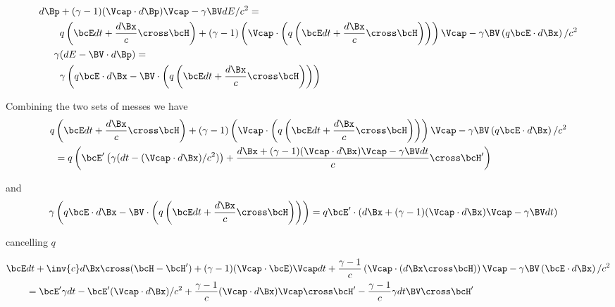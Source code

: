 \begin{equation}\label{eqn:lorentz_force_tx_2:60}
\begin{aligned}
d\Bp &+ (\gamma-1)(\Vcap \cdot d\Bp) \Vcap - \gamma \BV dE/c^2 = \\
&q \left( \bcE dt + \frac{d\Bx}{c} \cross \bcH \right) + (\gamma-1)\left(\Vcap \cdot \left(q \left( \bcE dt + \frac{d\Bx}{c} \cross \bcH \right)\right)\right) \Vcap - \gamma \BV \left( q \bcE \cdot d\Bx \right)/c^2  \\
\gamma &( dE - \BV \cdot d\Bp ) = \\
&\gamma \left( q \bcE \cdot d\Bx - \BV \cdot \left(q \left( \bcE dt + \frac{d\Bx}{c} \cross \bcH \right)\right) \right)
\end{aligned}
\end{equation}

Combining the two sets of messes we have
\begin{equation}\label{eqn:lorentz_force_tx_2:80}
\begin{aligned}
q &\left( \bcE dt + \frac{d\Bx}{c} \cross \bcH \right) + (\gamma-1)\left(\Vcap \cdot \left(q \left( \bcE dt + \frac{d\Bx}{c} \cross \bcH \right)\right)\right) \Vcap - \gamma \BV \left( q \bcE \cdot d\Bx \right)/c^2  \\
&=q \left( \bcE' \left(\gamma ( dt - (\Vcap \cdot d\Bx )/c^2 )\right) + \frac{d\Bx + (\gamma-1)(\Vcap \cdot d\Bx) \Vcap - \gamma \BV dt}{c} \cross \bcH' \right)  \\
\end{aligned}
\end{equation}

and
\begin{equation}\label{eqn:lorentz_force_tx_2:100}
\begin{aligned}
\gamma &\left( q \bcE \cdot d\Bx - \BV \cdot \left(q \left( \bcE dt + \frac{d\Bx}{c} \cross \bcH \right)\right) \right)
=
q \bcE' \cdot \left(d\Bx + (\gamma-1)(\Vcap \cdot d\Bx) \Vcap - \gamma \BV dt\right)
\end{aligned}
\end{equation}

cancelling \(q\)

\begin{equation}\label{eqn:lorentz_force_tx_2:120}
\begin{aligned}
\bcE &dt
+ \inv{c} d\Bx \cross (\bcH - \bcH')
+ (\gamma-1)(\Vcap \cdot \bcE) \Vcap dt
+ \frac{\gamma-1}{c}\left(\Vcap \cdot \left( d\Bx \cross \bcH \right)\right) \Vcap
- \gamma \BV \left( \bcE \cdot d\Bx \right)/c^2  \\
&=
\bcE' \gamma dt
-\bcE' (\Vcap \cdot d\Bx )/c^2
+ \frac{\gamma-1}{c} (\Vcap \cdot d\Bx) \Vcap \cross \bcH'
- \frac{\gamma-1}{c}\gamma dt \BV \cross \bcH'
\end{aligned}
\end{equation}

